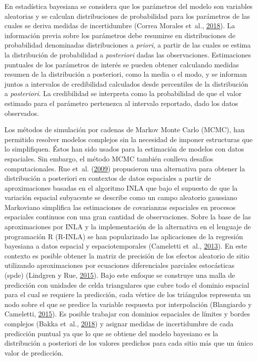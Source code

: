 \documentclass[11pt,b5paper,]{krantz}
\begin{document}
En estadística bayesiana se considera que los parámetros del modelo son
variables aleatorias y se calculan distribuciones de probabilidad para
los parámetros de las cuales se deriva medidas de incertidumbre (Correa
Morales et~al.,
\protect\hyperlink{ref-Correa_Morales_Causil_Javier_2018}{2018}). La
información previa sobre los parámetros debe resumirse en distribuciones
de probabilidad denominadas distribuciones a \emph{priori}, a partir de
las cuales se estima la distribución de probabilidad a \emph{posteriori}
dadas las observaciones. Estimaciones puntuales de los parámetros de
interés se pueden obtener calculando medidas resumen de la distribución
a posteriori, como la media o el modo, y se informan juntos a intervalos
de credibilidad calculados desde percentiles de la distribución a
\emph{posteriori}. La credibilidad se interpreta como la probabilidad de
que el valor estimado para el parámetro pertenezca al intervalo
reportado, dado los datos observados.

Los métodos de simulación por cadenas de Markov Monte Carlo (MCMC), han
permitido resolver modelos complejos sin la necesidad de imponer
estructuras que lo simplifiquen. Éstos han sido usados para la
estimación de modelos con datos espaciales. Sin embargo, el método MCMC
también conlleva desafíos computacionales. Rue et~al.
(\protect\hyperlink{ref-Rue_Martino_Chopin_2009}{2009}) propusieron una
alternativa para obtener la distribución a posteriori en contextos de
datos espaciales a partir de aproximaciones basadas en el algoritmo INLA
que bajo el supuesto de que la variación espacial subyacente se describe
como un campo aleatorio gaussiano Markoviano simplifica las estimaciones
de covarianzas espaciales en procesos espaciales continuos con una gran
cantidad de observaciones. Sobre la base de las aproximaciones por INLA
y la implementación de la alternativa en el lenguaje de programación R
(R-INLA) se han popularizado las aplicaciones de la regresión bayesiana
a datos espacial y espaciotemporales (Cameletti et~al.,
\protect\hyperlink{ref-Cameletti_Lindgren_Simpson_Rue_2013}{2013}). En
este contexto es posible obtener la matriz de precisión de los efectos
aleatorio de sitio utilizando aproximaciones por ecuaciones
diferenciales parciales estocásticas (spde) (Lindgren y Rue,
\protect\hyperlink{ref-Lindgren_Rue_2015}{2015}). Bajo este enfoque se
construye una malla de predicción con unidades de celda triangulares que
cubre todo el dominio espacial para el cual se requiere la predicción,
cada vértice de los triángulos representa un nodo sobre el que se
predice la variable respuesta por interpolación (Blangiardo y Cameletti,
\protect\hyperlink{ref-Blangiardo_Cameletti_2015}{2015}). Es posible
trabajar con dominios espaciales de límites y bordes complejos (Bakka
et~al.,
\protect\hyperlink{ref-Bakka_Rue_Fuglstad_Riebler_Bolin_Illian_Krainski_Simpson_Lindgren_2018}{2018})
y asignar medidas de incertidumbre de cada predicción puntual ya que lo
que se obtiene del modelo bayesiano es la distribución a posteriori de
los valores predichos para cada sitio más que un único valor de
predicción.
\end{document}
